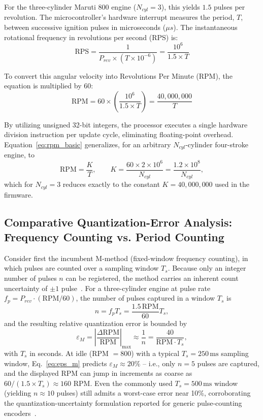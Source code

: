 \documentclass[journal, twocolumn]{IEEEtran}
\begin{document}
For the three-cylinder Maruti 800 engine ($N_{cyl} = 3$), this yields $1.5$ pulses per revolution. The microcontroller's hardware interrupt measures the period, $T$, between successive ignition pulses in microseconds ($\mu s$). The instantaneous rotational frequency in revolutions per second (RPS) is:
\begin{equation}
\text{RPS} = \frac{1}{P_{rev} \times (T \times 10^{-6})} = \frac{10^6}{1.5 \times T}
\label{eq:rps}
\end{equation}

To convert this angular velocity into Revolutions Per Minute (RPM), the equation is multiplied by 60:
\begin{equation}
\text{RPM} = 60 \times \left( \frac{10^6}{1.5 \times T} \right) = \frac{40{,}000{,}000}{T}
\label{eq:rpm_basic}
\end{equation}

By utilizing unsigned 32-bit integers, the processor executes a single hardware division instruction per update cycle, eliminating floating-point overhead. Equation~\eqref{eq:rpm_basic} generalizes, for an arbitrary $N_{cyl}$-cylinder four-stroke engine, to
\begin{equation}
\text{RPM} = \frac{K}{T}, \qquad K = \frac{60 \times 2 \times 10^6}{N_{cyl}} = \frac{1.2\times10^{8}}{N_{cyl}},
\label{eq:rpm_general}
\end{equation}
which for $N_{cyl}=3$ reduces exactly to the constant $K = 40{,}000{,}000$ used in the firmware.

\subsection{Comparative Quantization-Error Analysis: Frequency Counting vs. Period Counting}
Consider first the incumbent M-method (fixed-window frequency counting), in which pulses are counted over a sampling window $T_s$. Because only an integer number of pulses $n$ can be registered, the method carries an inherent count uncertainty of $\pm 1$ pulse~\cite{motioncontroltips,encoderspeedmeasurement}. For a three-cylinder engine at pulse rate $f_p = P_{rev}\cdot(\text{RPM}/60)$, the number of pulses captured in a window $T_s$ is
\begin{equation}
n = f_p T_s = \frac{1.5\,\text{RPM}}{60}T_s,
\label{eq:npulses}
\end{equation}
and the resulting relative quantization error is bounded by
\begin{equation}
\varepsilon_{M} = \left|\frac{\Delta \text{RPM}}{\text{RPM}}\right|_{\max} \approx \frac{1}{n} = \frac{40}{\text{RPM}\cdot T_s},
\label{eq:eps_m}
\end{equation}
with $T_s$ in seconds. At idle (RPM $=800$) with a typical $T_s = 250\,\text{ms}$ sampling window, Eq.~\eqref{eq:eps_m} predicts $\varepsilon_M \approx 20\%$ -- i.e., only $n=5$ pulses are captured, and the displayed RPM can jump in increments as coarse as $60/(1.5\times T_s)\approx 160$ RPM. Even the commonly used $T_s=500\,\text{ms}$ window (yielding $n\approx10$ pulses) still admits a worst-case error near 10\%, corroborating the quantization-uncertainty formulation reported for generic pulse-counting encoders~\cite{encoderspeedmeasurement,indmonitor}.
\end{document}
